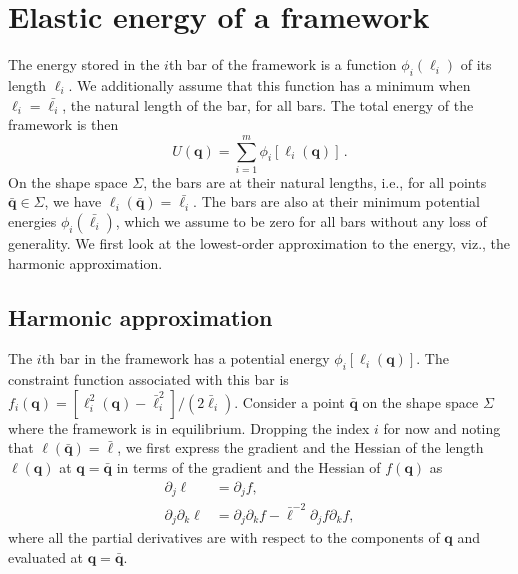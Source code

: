 %

\section{Elastic energy of a framework}
\label{sec:energy}

The energy stored in the $i$th bar of the framework is a function $\phi_i(\ell_i)$ of its length $\ell_i$.
We additionally assume that this function has a minimum when $\ell_i = \bar{\ell_i}$, the natural length of the bar, for all bars.
The total energy of the framework is then
%
\begin{equation}
  U({\bm{q}}) = \sum_{i=1}^{m} \phi_i[\ell_i({\bm{q}})]\,.
\end{equation}
%
On the shape space $\Sigma$, the bars are at their natural lengths, i.e., for all points $\bar{\bm{q}} \in \Sigma$, we have $\ell_i(\bar{\bm{q}}) = \bar{\ell_i}$.
The bars are also at their minimum potential energies $\phi_i(\bar{\ell_i})$, which we assume to be zero for all bars without any loss of generality.
We first look at the lowest-order approximation to the energy, viz., the harmonic approximation.

\subsection{Harmonic approximation}

The $i$th bar in the framework has a potential energy $\phi_i[\ell_i(\bm{q})]$.
The constraint function associated with this bar is $f_i(\bm{q}) = [\ell_i^2(\bm{q}) - \bar{\ell}_i^2]/(2\bar{\ell}_i)$.
Consider a point $\bar{\bm{q}}$ on the shape space $\Sigma$ where the framework is in equilibrium.
Dropping the index $i$ for now and noting that $\ell(\bar{\bm{q}}) = \bar{\ell}$, we first express the gradient and the Hessian of the length $\ell(\bm{q})$ at $\bm{q} = \bar{\bm{q}}$ in terms of the gradient and the Hessian of $f(\bm{q})$ as
%
\begin{equation}
\begin{aligned}
  \partial_j \ell &= \partial_j f,\\
  \partial_j\partial_k \ell &= \partial_j\partial_k f - \bar{\ell}^{-2}\partial_j f\partial_k f,
  \label{sm:eq:lentomap}
\end{aligned}
\end{equation}
%
where all the partial derivatives are with respect to the components of $\bm{q}$ and evaluated at $\bm{q} = \bar{\bm{q}}$.

